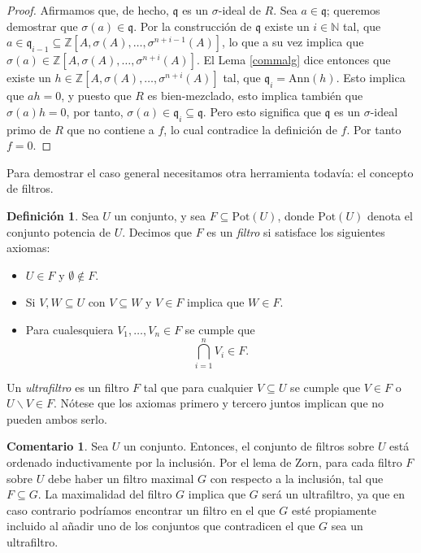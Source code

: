 \documentclass[letterpaper]{article}
\def\N{\mathbb{N}}
\def\Z{\mathbb{Z}}
\def\q{\mathfrak{q}}
\def\s{\sigma}
\theoremstyle{definition}
\newtheorem{rem}[Satz]{Comentario}
\newtheorem{defn}[Satz]{Definici\'on}
\begin{document}
\begin{proof}
Afirmamos que, de hecho, $\q$ es un $\sigma$-ideal de $R$. Sea $a \in \q$; queremos demostrar que  $\s(a) \in \q$.  
Por la construcci\'on de $\q$ existe un $i \in \N$ tal, que $a \in \q_{i-1} \subseteq \Z[A,\s(A),\ldots,\s^{n+i-1}(A)]$, lo que a su vez implica que $\s(a) \in \Z[A,\s(A),\ldots,\s^{n+i}(A)]$. 
El Lema \ref{commalg} dice entonces que existe un $h \in \Z[A,\s(A),\ldots,\s^{n+i}(A)]$ tal, que $ \q_i = \text{Ann}(h)$.
Esto implica que $ah = 0$, y puesto que $R$ es bien-mezclado, esto implica tambi\'en que $\s(a)h = 0$, por tanto, $\s(a) \in \q_i \subseteq \q$. 
Pero esto significa que  $\q$ es un $\sigma$-ideal primo de $R$ que no contiene a $f$, lo cual contradice la definici\'on de $f$. Por tanto $f = 0$.
\end{proof}


Para demostrar el caso general necesitamos otra herramienta todav\'ia: el concepto de filtros.

\begin{defn}
Sea $U$ un conjunto, y sea $F \subseteq \text{Pot}(U)$, donde $\text{Pot}(U)$ denota el conjunto potencia de $U$. Decimos que $F$ es un \emph{filtro} si satisface los siguientes axiomas:
\begin{itemize}
\item  $U \in F$ y $\emptyset \notin F$.
\item Si $V,W \subseteq U$ con $V \subseteq W \text{ y }V  \in F $ implica que $W \in F$.
\item Para cualesquiera $V_1, \ldots, V_n \in F$ se cumple que \[ \bigcap_{i = 1}^n V_i \in F. \]
\end{itemize}
Un \emph{ultrafiltro} es un filtro $F$ tal que para cualquier $V \subseteq U$ se cumple que $V \in F$ o $U \backslash V \in F$. N\'otese que los axiomas primero y tercero juntos implican que no pueden ambos serlo.
\end{defn}

\begin{rem}
Sea $U$ un conjunto. Entonces, el conjunto de filtros sobre $U$ est\'a ordenado inductivamente por la inclusi\'on. Por el lema de Zorn, para cada filtro $F$ sobre $U$ debe haber un filtro maximal $G$ con respecto a la inclusi\'on, tal que $F \subseteq G$.
La maximalidad del filtro $G$ implica que $G$ ser\'a un ultrafiltro, ya que en caso contrario podr\'iamos encontrar un filtro en el que $G$ est\'e propiamente incluido al a\~nadir uno de los conjuntos que contradicen el que $G$ sea un ultrafiltro.
\end{rem}
\end{document}
